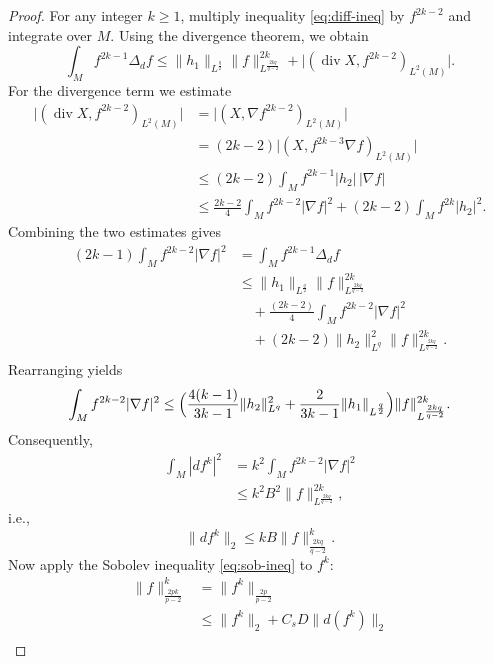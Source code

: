 \documentclass[12pt, twoside]{article}
\theoremstyle{definition}
\numberwithin{equation}{section}
\def \De {\Delta}
\def\na {\nabla}
\begin{document}
	\begin{proof}
		For any integer \(k \ge 1\), multiply inequality \eqref{eq:diff-ineq} by \(f^{2k-2}\) and integrate over \(M\). Using the divergence theorem, we obtain
		\[
		\int_M f^{2k-1}\Delta_d f \le 
		\|h_1\|_{L^\frac{q}{2} } \|f\|_{L^{\frac{2kq}{q-2}}}^{2k}
		+ \bigl|(\operatorname{div} X, f^{2k-2})_{L^2(M)}\bigr|.
		\]
		For the divergence term we estimate
		\begin{align*}
		\bigl|(\operatorname{div} X, f^{2k-2})_{L^2(M)}\bigr|
		&= \bigl|(X, \nabla f^{2k-2})_{L^2(M)}\bigr| \\
		&= (2k-2)\bigl|(X, f^{2k-3}\nabla f)_{L^2(M)}\bigr| \\
		&\le (2k-2)\int_M f^{2k-1}|h_2|\,|\nabla f| \\
		&\le \frac{2k-2}{4}\int_M f^{2k-2}|\nabla f|^2 
		+ (2k-2)\int_M f^{2k}|h_2|^2 .
		\end{align*}
		Combining the two estimates gives
		\begin{align*}
		(2k-1)\int_{M}f^{2k-2}|\na f|^{2}&=\int_{M}f^{2k-1}\De_{d}f\\
		&\leq  \|h_{1}\|_{L^{\frac{q}{2}}}\|f\|^{2k}_{L^{\frac{2kq}{q-2}}}\\
		&\quad+\frac{(2k-2)}{4}\int_{M}f^{2k-2}|\na f|^{2}\\
		&\quad+(2k-2)\|h_{2}\|^{2}_{L^{q}}\|f\|^{2k}_{L^{\frac{2kq}{q-2}}}.\\
		\end{align*}
		Rearranging yields
		\begin{equation}\label{V6}
		\int_M f^{2k-2}|\nabla f|^2 \le 
		\Bigl(\frac{4(k-1)}{3k-1}\|h_2\|_{L^{q}}^2 +\frac{2}{3k-1} \|h_1\|_{L^\frac{q}{2}}\Bigr)
		\|f\|_{L^{\frac{2kq}{q-2}}}^{2k}.
		\end{equation}   
		Consequently,
		\begin{align*}
		\int_M |d f^k|^2 &= k^2\int_M f^{2k-2}|\nabla f|^2 \\
		&\le k^2 B^2 \|f\|_{L^{\frac{2kq}{q-2}}}^{2k},
		\end{align*}
		i.e.,
		\begin{equation}\label{eq:gradient-bound}
		\|d f^k\|_2 \le k B \|f\|_{\frac{2kq}{q-2}}^k .
		\end{equation}
		{
		Now apply the Sobolev inequality \eqref{eq:sob-ineq} to \(f^k\):
		\begin{align*}
		\|f\|_{\frac{2pk}{p-2}}^k 
		&= \|f^k\|_{\frac{2p}{p-2}} \\
		&\le \|f^k\|_2 + C_s D \|d(f^k)\|_2 \\

\end{align*}}
\end{proof}
\end{document}
